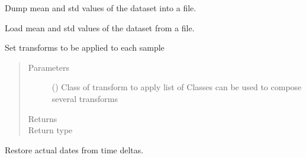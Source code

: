 \documentclass[letterpaper,10pt,english]{sphinxmanual}
\begin{document}
\begin{fulllineitems}

\begin{fulllineitems}
\label{\detokenize{api/datasets:geology.datasets.FieldDataset.dump_statistics}}
Dump mean and std values of the dataset into a file.

\end{fulllineitems}


\begin{fulllineitems}
\label{\detokenize{api/datasets:geology.datasets.FieldDataset.load_statistics}}
Load mean and std values of the dataset from a file.

\end{fulllineitems}


\begin{fulllineitems}
\label{\detokenize{api/datasets:geology.datasets.FieldDataset.set_transform}}
Set transforms to be applied to each sample
\begin{quote}\begin{description}
\item[{Parameters}] \leavevmode
{} () \textendash{} Class of transform to apply
list of Classes can be used to compose several transforms

\item[{Returns}] \leavevmode
{}

\item[{Return type}] \leavevmode
{\hyperref[\detokenize{api/datasets:geology.datasets.FieldDataset}]{}}

\end{description}\end{quote}

\end{fulllineitems}


\begin{fulllineitems}
\label{\detokenize{api/datasets:geology.datasets.FieldDataset.to_dates}}
Restore actual dates from time deltas.

\end{fulllineitems}


\end{fulllineitems}
\end{document}
